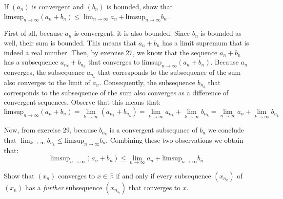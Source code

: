 \begin{exercise}{31}
    If $(a_n)$ is convergent and $(b_n)$ is bounded, show that $\text{limsup}_{n \rightarrow \infty}(a_n + b_n) \leq \lim_{n \rightarrow \infty} a_n + \text{limsup}_{n \rightarrow \infty} b_n$.
\end{exercise}

\begin{solution}

    First of all, because $a_n$ is convergent, it is also bounded. Since $b_n$ is bounded as well, their sum is bounded. This means that $a_n + b_n$ has a limit supremum that is indeed a real number. Then, by exercise 27, we know that the sequence $a_{n} + b_{n}$ has a subsequence $a_{n_k} + b_{n_k}$ that converges to $\text{limsup}_{n \rightarrow \infty} (a_n + b_n)$. Because $a_n$ converges, the subsequence $a_{n_k}$ that corresponds to the subsequence of the sum also converges to the limit of $a_n$. Consequently, the subsequence $b_{n_k}$ that corresponds to the subsequence of the sum also converges as a difference of convergent sequences. Observe that this means that:
    $$\text{limsup}_{n \rightarrow \infty}(a_n + b_n) = \lim_{k \rightarrow \infty}(a_{n_k} + b_{n_k}) = \lim_{k \rightarrow \infty} a_{n_k} + \lim_{k \rightarrow \infty} b_{n_k} = \lim_{n \rightarrow \infty} a_n + \lim_{k \rightarrow \infty} b_{n_k}$$

    Now, from exercise 29, because $b_{n_k}$ is a convergent subsequnce of $b_n$ we conclude that $\lim_{k \rightarrow \infty} b_{n_k} \leq \text{limsup}_{n \rightarrow \infty} b_n$. Combining these two observations we obtain that:
    $$\text{limsup}_{n \rightarrow \infty}(a_n + b_n) \leq \lim_{n\rightarrow \infty} a_n + \text{limsup}_{n \rightarrow \infty} b_n$$
\end{solution}

\begin{exercise}{33}
    Show that $(x_n)$ converges to $x \in \mathbb{R}$ if and only if every subsequence $(x_{n_k})$ of $(x_n)$ has a \textit{further} subsequence $(x_{n_{k_l}})$ that converges to $x$.
\end{exercise}

